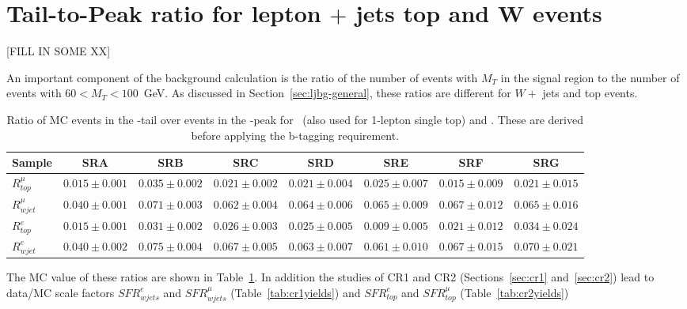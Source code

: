 \section{Tail-to-Peak ratio for lepton $+$ jets top and W events}
\label{sec:ttp}

[FILL IN SOME XX]


An important component
of the background calculation is the ratio of the number of events with $M_T$ in the signal region
to the number of events with $60 < M_T < 100$~GeV.  
As discussed in Section~\ref{sec:ljbg-general}, these ratios are different for $W +$ jets and 
top events.  



\begin{table}[!h]
\begin{center}
{\footnotesize
\begin{tabular}{l||c|c|c|c|c|c|c}
\hline
Sample              & SRA & SRB & SRC & SRD & SRE & SRF & SRG\\
\hline
\hline
$R^{\mu}_{top}$ 	  & $0.015 \pm 0.001$  & $0.035 \pm 0.002$  & $0.021 \pm 0.002$  & $0.021 \pm 0.004$  & $0.025 \pm 0.007$  & $0.015 \pm 0.009$  & $0.021 \pm 0.015$  \\
$R^{\mu}_{wjet}$ 	  & $0.040 \pm 0.001$  & $0.071 \pm 0.003$  & $0.062 \pm 0.004$  & $0.064 \pm 0.006$  & $0.065 \pm 0.009$  & $0.067 \pm 0.012$  & $0.065 \pm 0.016$  \\
\hline
\hline
$R^e_{top}$ 	  & $0.015 \pm 0.001$  & $0.031 \pm 0.002$  & $0.026 \pm 0.003$  & $0.025 \pm 0.005$  & $0.009 \pm 0.005$  & $0.021 \pm 0.012$  & $0.034 \pm 0.024$  \\
$R^e_{wjet}$ 	  & $0.040 \pm 0.002$  & $0.075 \pm 0.004$  & $0.067 \pm 0.005$  & $0.063 \pm 0.007$  & $0.061 \pm 0.010$  & $0.067 \pm 0.015$  & $0.070 \pm 0.021$  \\
\hline
\end{tabular}}
\caption{ Ratio of MC events in the \mt-tail over events in the \mt-peak for
  \ttsl\ (also used for 1-lepton single top) and \wjets. These are
  derived before applying the b-tagging requirement.  
\label{tab:ttp}}
\end{center}
\end{table}

The MC value of these ratios are shown in Table~\ref{tab:ttp}.
In addition the studies of CR1 and CR2 (Sections~\ref{sec:cr1} and~\ref{sec:cr2})
lead to data/MC scale factors 
$SFR^{e}_{wjets}$ and  $SFR^{\mu}_{wjets}$ (Table~\ref{tab:cr1yields}) and
$SFR^{e}_{top}$ and  $SFR^{\mu}_{top}$ (Table~\ref{tab:cr2yields})

\clearpage